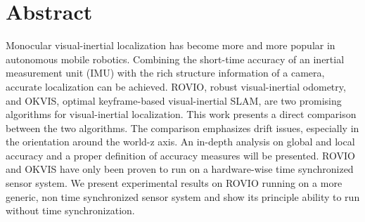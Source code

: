 \chapter*{Abstract}

Monocular visual-inertial localization has become more and more popular in autonomous mobile robotics. Combining the short-time accuracy of an inertial measurement unit (IMU) with the rich structure information of a camera, accurate localization can be achieved. ROVIO, robust visual-inertial odometry, and OKVIS, optimal keyframe-based visual-inertial SLAM, are two promising algorithms for visual-inertial localization. This work presents a direct comparison between the two algorithms. The comparison emphasizes drift issues, especially in the orientation around the world-z axis. An in-depth analysis on global and local accuracy and a proper definition of accuracy measures will be presented. ROVIO and OKVIS have only been proven to run on a hardware-wise time synchronized sensor system. We present experimental results on ROVIO running on a more generic, non time synchronized sensor system and show its principle ability to run without time synchronization.











